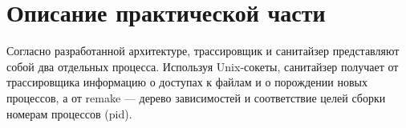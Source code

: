 \section{Описание практической части}
\label{sec:Chapter4} 


Согласно разработанной архитектуре, трассировщик и санитайзер представляют собой два отдельных процесса. Используя Unix-сокеты, санитайзер получает от трассировщика информацию о доступах к файлам и о порождении новых процессов, а от remake --- дерево зависимостей и соответствие целей сборки номерам процессов (pid).

